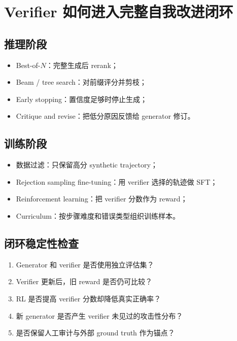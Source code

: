 \documentclass[a4paper]{article}
\begin{document}
\section{Verifier 如何进入完整自我改进闭环}

\subsection{推理阶段}

\begin{itemize}
    \item Best-of-$N$：完整生成后 rerank；
    \item Beam / tree search：对前缀评分并剪枝；
    \item Early stopping：置信度足够时停止生成；
    \item Critique and revise：把低分原因反馈给 generator 修订。
\end{itemize}

\subsection{训练阶段}

\begin{itemize}
    \item 数据过滤：只保留高分 synthetic trajectory；
    \item Rejection sampling fine-tuning：用 verifier 选择的轨迹做 SFT；
    \item Reinforcement learning：把 verifier 分数作为 reward；
    \item Curriculum：按步骤难度和错误类型组织训练样本。
\end{itemize}

\subsection{闭环稳定性检查}

\begin{enumerate}
    \item Generator 和 verifier 是否使用独立评估集？
    \item Verifier 更新后，旧 reward 是否仍可比较？
    \item RL 是否提高 verifier 分数却降低真实正确率？
    \item 新 generator 是否产生 verifier 未见过的攻击性分布？
    \item 是否保留人工审计与外部 ground truth 作为锚点？
\end{enumerate}
\end{document}
